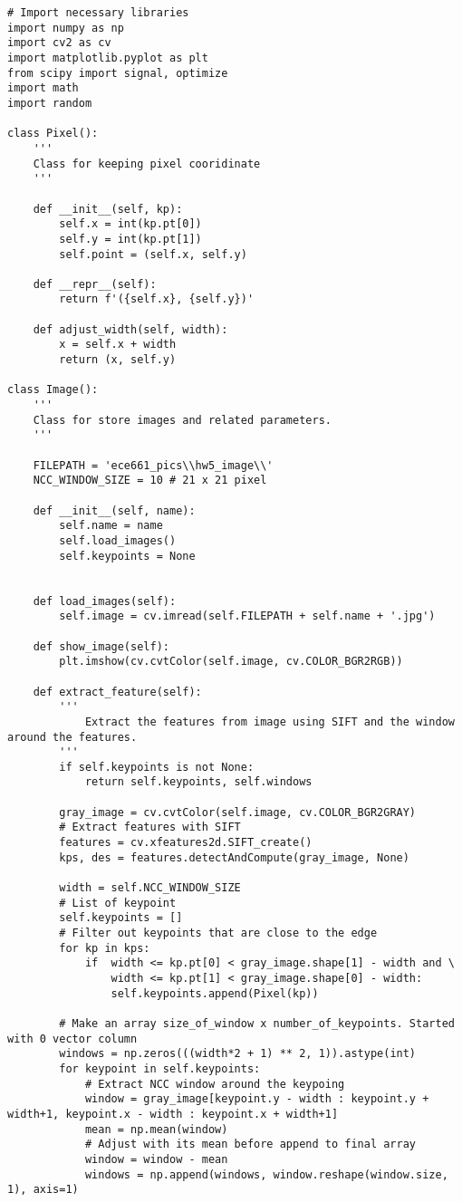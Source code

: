 \documentclass[11pt]{article}
\begin{document}
\begin{lstlisting}
# Import necessary libraries
import numpy as np
import cv2 as cv
import matplotlib.pyplot as plt
from scipy import signal, optimize
import math
import random

class Pixel():
    '''
    Class for keeping pixel cooridinate
    '''

    def __init__(self, kp):
        self.x = int(kp.pt[0])
        self.y = int(kp.pt[1])
        self.point = (self.x, self.y)

    def __repr__(self):
        return f'({self.x}, {self.y})'

    def adjust_width(self, width):
        x = self.x + width
        return (x, self.y)

class Image():
    ''' 
    Class for store images and related parameters.
    '''

    FILEPATH = 'ece661_pics\\hw5_image\\'
    NCC_WINDOW_SIZE = 10 # 21 x 21 pixel

    def __init__(self, name):
        self.name = name
        self.load_images()
        self.keypoints = None
        

    def load_images(self):
        self.image = cv.imread(self.FILEPATH + self.name + '.jpg')

    def show_image(self):
        plt.imshow(cv.cvtColor(self.image, cv.COLOR_BGR2RGB))

    def extract_feature(self):
        '''
            Extract the features from image using SIFT and the window around the features.
        '''
        if self.keypoints is not None:
            return self.keypoints, self.windows
        
        gray_image = cv.cvtColor(self.image, cv.COLOR_BGR2GRAY)
        # Extract features with SIFT
        features = cv.xfeatures2d.SIFT_create()
        kps, des = features.detectAndCompute(gray_image, None)

        width = self.NCC_WINDOW_SIZE
        # List of keypoint
        self.keypoints = []
        # Filter out keypoints that are close to the edge
        for kp in kps:
            if  width <= kp.pt[0] < gray_image.shape[1] - width and \
                width <= kp.pt[1] < gray_image.shape[0] - width:
                self.keypoints.append(Pixel(kp))
        
        # Make an array size_of_window x number_of_keypoints. Started with 0 vector column
        windows = np.zeros(((width*2 + 1) ** 2, 1)).astype(int)
        for keypoint in self.keypoints:
            # Extract NCC window around the keypoing
            window = gray_image[keypoint.y - width : keypoint.y + width+1, keypoint.x - width : keypoint.x + width+1]
            mean = np.mean(window)
            # Adjust with its mean before append to final array
            window = window - mean
            windows = np.append(windows, window.reshape(window.size, 1), axis=1)
        

\end{lstlisting}
\end{document}
